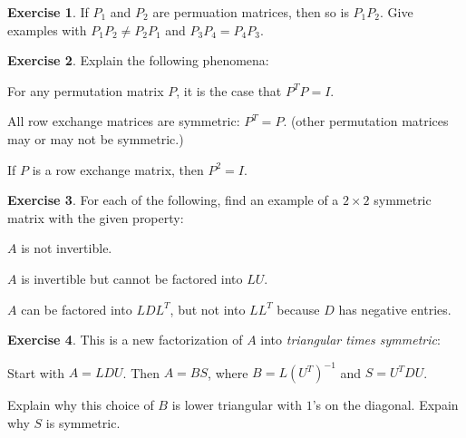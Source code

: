 \documentclass[11pt]{amsart}
\theoremstyle{definition}
\newtheorem{exercise}{Exercise}
\begin{document}
\begin{exercise}
If $P_1$ and $P_2$ are permuation matrices, then so is $P_1P_2$. Give examples with $P_1P_2 \neq P_2P_1$ and $P_3P_4 = P_4P_3$.
\end{exercise}


\begin{exercise}
Explain the following phenomena:
\begin{compactitem}
\item For any permutation matrix $P$, it is the case that $P^T P = I$.
\item All row exchange matrices are symmetric: $P^T = P$. (other permutation matrices may or may not be symmetric.)
\item If $P$ is a row exchange matrix, then $P^2 = I$.
\end{compactitem}
\end{exercise}


\begin{exercise}
For each of the following, find an example of a $2\times 2$ symmetric matrix with the given property:
\begin{compactitem}
\item $A$ is not invertible.
\item $A$ is invertible but cannot be factored into $LU$.
\item $A$ can be factored into $LDL^T$, but not into $LL^T$ because $D$ has negative entries.
\end{compactitem}
\end{exercise}


\begin{exercise}
This is a new factorization of $A$ into \emph{triangular times symmetric}:

Start with $A = LDU$. Then $A = B S$, where $B = L\left(U^T\right)^{-1}$ and $S = U^T D U$.

Explain why this choice of $B$ is lower triangular with $1$'s on the diagonal. Expain why $S$ is symmetric.
\end{exercise}
\end{document}
